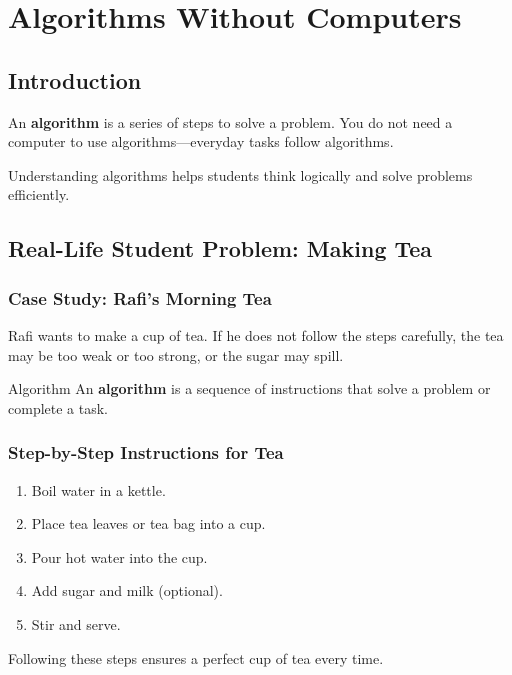 \chapter{Algorithms Without Computers}

\section{Introduction}

An \textbf{algorithm} is a series of steps to solve a problem.  
You do not need a computer to use algorithms—everyday tasks follow algorithms.  

Understanding algorithms helps students think logically and solve problems efficiently.

\section{Real-Life Student Problem: Making Tea}

\subsection{Case Study: Rafi’s Morning Tea}

Rafi wants to make a cup of tea. If he does not follow the steps carefully, the tea may be too weak or too strong, or the sugar may spill.  

\begin{definition}{Algorithm}
An \textbf{algorithm} is a sequence of instructions that solve a problem or complete a task.
\end{definition}

\subsection{Step-by-Step Instructions for Tea}

\begin{enumerate}
    \item Boil water in a kettle.
    \item Place tea leaves or tea bag into a cup.
    \item Pour hot water into the cup.
    \item Add sugar and milk (optional).
    \item Stir and serve.
\end{enumerate}

Following these steps ensures a perfect cup of tea every time.  

